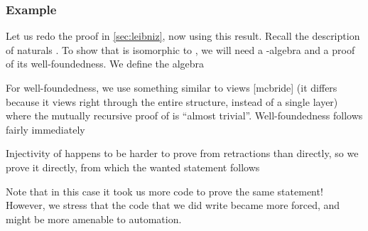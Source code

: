 \subsubsection{Example}
Let us redo the proof in \autoref{sec:leibniz}, now using this result. Recall the description of naturals . To show that  is isomorphic to , we will need a -algebra and a proof of its well-foundedness. We define the algebra

For well-foundedness, we use something similar to views [mcbride] (it differs because it views right through the entire structure, instead of a single layer)
where the mutually recursive proof of  is ``almost trivial''. Well-foundedness follows fairly immediately

Injectivity of  happens to be harder to prove from retractions than directly, so we prove it directly, from which the wanted statement follows

Note that in this case it took us more code to prove the same statement! However, we stress that the code that we did write became more forced, and might be more amenable to automation.


